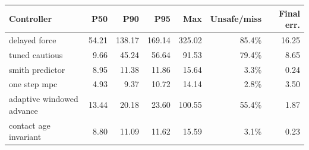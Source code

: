 \begin{tabular}{lrrrrrr}\toprule
Controller & P50 & P90 & P95 & Max & Unsafe/miss & Final err.\\
\midrule
delayed force & 54.21 & 138.17 & 169.14 & 325.02 & 85.4\% & 16.25\\
tuned cautious & 9.66 & 45.24 & 56.64 & 91.53 & 79.4\% & 8.65\\
smith predictor & 8.95 & 11.38 & 11.86 & 15.64 & 3.3\% & 0.24\\
one step mpc & 4.93 & 9.37 & 10.72 & 14.14 & 2.8\% & 3.50\\
adaptive windowed advance & 13.44 & 20.18 & 23.60 & 100.55 & 55.4\% & 1.87\\
contact age invariant & 8.80 & 11.09 & 11.62 & 15.59 & 3.1\% & 0.23\\
\bottomrule\end{tabular}
